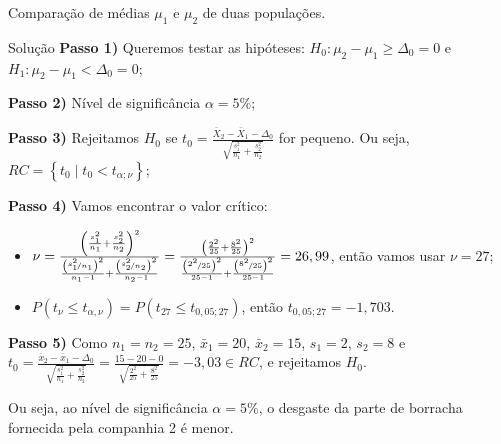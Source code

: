 \documentclass[9pt]{beamer}
\begin{document}
\begin{frame}{Comparação de médias $\mu_1$ e $\mu_2$ de duas populações.}

\small
\begin{block}{Solução}
	\textbf{Passo 1)} Queremos testar as hipóteses: $H_0: \mu_2 - \mu_1 \geq \Delta_0=0$ e $H_1: \mu_2 - \mu_1 < \Delta_0=0$;
	
	\textbf{Passo 2)} Nível de significância $\alpha=5\%$;
	
	\textbf{Passo 3)} Rejeitamos $H_0$ se $t_0=\frac{\bar{X}_2 - \bar{X}_1 - \Delta_0}{\sqrt{\frac{s_1^2}{n_1} + \frac{s_2^2}{n_2}}} $ for pequeno. Ou seja, $RC = \left\{ t_0 \mid t_0 < t_{\alpha; \nu} \right\}$;
	
	\textbf{Passo 4)} Vamos encontrar o valor crítico:
	\begin{itemize}
		\item $\nu = \frac{\left( \frac{s_1^2}{n_1} + \frac{s_2^2}{n_2} \right)^2}{\frac{\left(\nicefrac{s_1^2}{n_1}\right)^2}{n_1-1} + \frac{\left(\nicefrac{s_2^2}{n_2}\right)^2}{n_2-1}} = \frac{\left( \frac{2^2}{25} + \frac{8^2}{25} \right)^2}{\frac{\left(\nicefrac{2^2}{25}\right)^2}{25-1} + \frac{\left(\nicefrac{8^2}{25}\right)^2}{25-1}} = 26,99$, então vamos usar $\nu = 27$;
		\item $P(t_\nu \leq t_{\alpha, \nu}) = P(t_{27} \leq t_{0,05; 27})$, então $t_{0,05; 27} = -1,703$.
	\end{itemize}

	\textbf{Passo 5)} Como $n_1=n_2=25$, $\bar{x}_1=20$, $\bar{x}_2=15$, $s_1=2$, $s_2=8$ e $t_0 = \frac{\bar{x}_2 - \bar{x}_1- \Delta_0}{\sqrt{\frac{s_1^2}{n_1} + \frac{s_2^2}{n_2}}} = \frac{15 - 20  - 0}{\sqrt{\frac{2^2}{25} + \frac{8^2}{25}}}=-3,03 \in RC$, e rejeitamos $H_0$. 
	
	Ou seja, ao nível de significância $\alpha=5\%$, o desgaste da parte de borracha fornecida pela companhia 2 é menor.
\end{block}
\normalsize

\end{frame}
\end{document}
